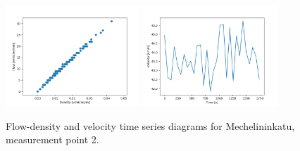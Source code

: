 \documentclass[english, 12pt, a4paper, elec, utf8, pdfa, online]{aaltothesis}
\begin{document}
\begin{figure}[ht!]
    \centering
    \includegraphics[width=0.45\textwidth]{graphs/Mechelininkatu_2_flw_dns.png}
    \includegraphics[width=0.45\textwidth]{graphs/Mechelininkatu_2_spd_time_6.png}
    \caption{Flow-density and velocity time series diagrams for Mechelininkatu, measurement point 2.}
\end{figure}
\end{document}
